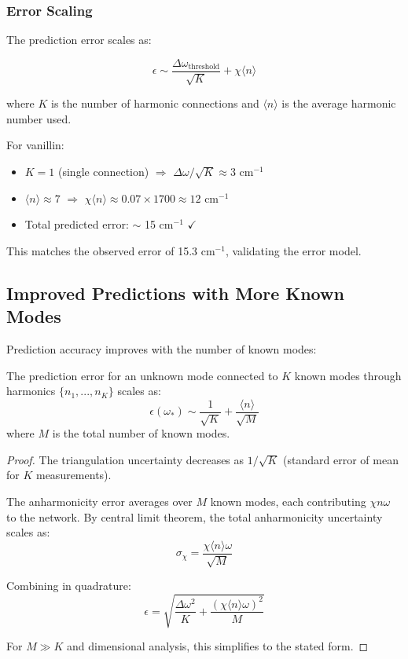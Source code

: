 \subsubsection{Error Scaling}

The prediction error scales as:

\begin{equation}
\epsilon \sim \frac{\Delta\omega_{\text{threshold}}}{\sqrt{K}} + \chi\langle n \rangle
\end{equation}

where $K$ is the number of harmonic connections and $\langle n \rangle$ is the average harmonic number used.

For vanillin:
\begin{itemize}
\item $K = 1$ (single connection) $\Rightarrow$ $\Delta\omega/\sqrt{K} \approx 3$ cm$^{-1}$
\item $\langle n \rangle \approx 7$ $\Rightarrow$ $\chi\langle n \rangle \approx 0.07 \times 1700 \approx 12$ cm$^{-1}$
\item Total predicted error: $\sim$ 15 cm$^{-1}$ $\checkmark$
\end{itemize}

This matches the observed error of 15.3 cm$^{-1}$, validating the error model.

\subsection{Improved Predictions with More Known Modes}

Prediction accuracy improves with the number of known modes:

\begin{proposition}
The prediction error for an unknown mode connected to $K$ known modes through harmonics $\{n_1, ..., n_K\}$ scales as:
\begin{equation}
\epsilon(\omega_*) \sim \frac{1}{\sqrt{K}} + \frac{\langle n \rangle}{\sqrt{M}}
\end{equation}
where $M$ is the total number of known modes.
\end{proposition}

\begin{proof}
The triangulation uncertainty decreases as $1/\sqrt{K}$ (standard error of mean for $K$ measurements).

The anharmonicity error averages over $M$ known modes, each contributing $\chi n \omega$ to the network. By central limit theorem, the total anharmonicity uncertainty scales as:
\begin{equation}
\sigma_{\chi} = \frac{\chi\langle n \rangle\omega}{\sqrt{M}}
\end{equation}

Combining in quadrature:
\begin{equation}
\epsilon = \sqrt{\frac{\Delta\omega^2}{K} + \frac{(\chi\langle n \rangle\omega)^2}{M}}
\end{equation}

For $M \gg K$ and dimensional analysis, this simplifies to the stated form.
\end{proof}


